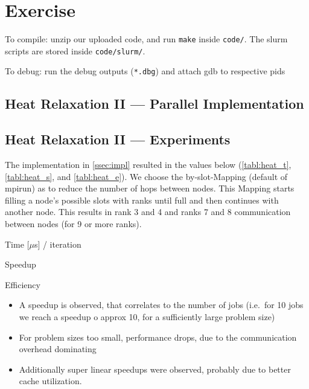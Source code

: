 \documentclass[]{scrartcl}
\newcommand{\exercise}{Exercise \thesection}
\begin{document}
\section*{\exercise}

To compile: unzip our uploaded code, and run \verb|make| inside \verb|code/|.
The slurm scripts are stored inside \verb|code/slurm/|.

To debug: run the debug outputs (\verb|*.dbg|) and attach gdb to respective pids

\subsection{Heat Relaxation II --- Parallel Implementation}\label{ssec:impl}
\subsection{Heat Relaxation II --- Experiments}

The implementation in \autoref{ssec:impl} resulted in the values below (\autoref{tabl:heat_t}, \autoref{tabl:heat_s}, and \autoref{tabl:heat_e}).
We choose the by-slot-Mapping (default of mpirun) as to reduce the number of hops between nodes.
This Mapping starts filling a node's possible slots with ranks until full and then continues with another node.
This results in rank 3 and 4 and ranks 7 and 8 communication between nodes (for 9 or more ranks).

\begin{table}[ht]
  \caption{Time [$\mu$s] / iteration}\label{tabl:heat_t}
  
\end{table}

\begin{table}[ht]
  \caption{Speedup}\label{tabl:heat_s}
  
\end{table}

\begin{table}[ht]
  \caption{Efficiency}\label{tabl:heat_e}
  
\end{table}

\begin{itemize}
  \item A speedup is observed, that correlates to the number of jobs (i.e.\ for 10 jobs we reach a speedup o approx 10, for a sufficiently large problem size)
  \item For problem sizes too small, performance drops, due to the communication overhead dominating
  \item Additionally super linear speedups were observed, probably due to better cache utilization.
\end{itemize}
\end{document}
